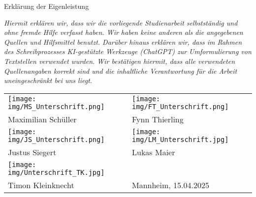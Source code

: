 \pagebreak
\hspace{0pt}
\vfill
\begin{center}
    \large{Erklärung der Eigenleistung}
\end{center}
\vspace{1em}
\begin{center}
    \textit{Hiermit erklären wir, dass wir die vorliegende Studienarbeit selbstständig und ohne fremde Hilfe verfasst haben. Wir haben keine anderen als die angegebenen Quellen und Hilfsmittel benutzt. Darüber hinaus erklären wir, dass im Rahmen des Schreibprozesses KI-gestützte Werkzeuge (ChatGPT) zur Umformulierung von Textstellen verwendet wurden. Wir bestätigen hiermit, dass alle verwendeten Quellenangaben korrekt sind und die inhaltliche Verantwortung für die Arbeit uneingeschränkt bei uns liegt.}
\end{center}

\begin{tabular}{>{\centering\arraybackslash}p{} >{\centering\arraybackslash}p{}}
  \texttt{[image: img/MS\_Unterschrift.png]}
  &
  \texttt{[image: img/FT\_Unterschrift.png]}
  \\
  Maximilian Schüller & Fynn Thierling \\
  \texttt{[image: img/JS\_Unterschrift.png]}
  &
  \texttt{[image: img/LM\_Unterschrift.jpg]}
  \\
  Justus Siegert & Lukas Maier \\
  \texttt{[image: img/Unterschrift\_TK.jpg]}
  &
  \\
  Timon Kleinknecht & Mannheim, 15.04.2025
\end{tabular}


\vfill
\hspace{0pt}
\pagebreak
